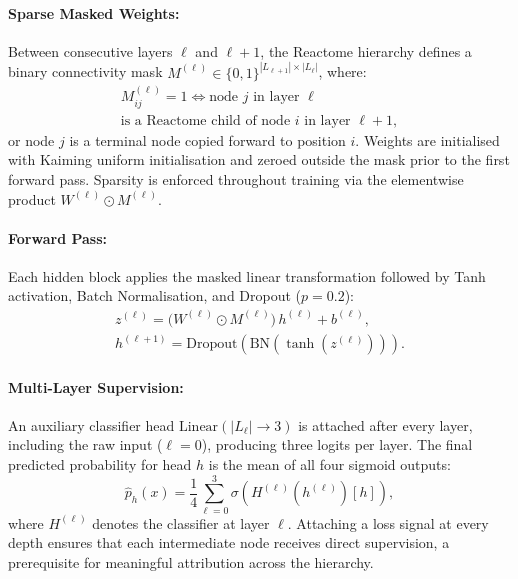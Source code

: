 \documentclass[sigconf]{acmart}
\begin{document}
\paragraph{Sparse Masked Weights:}
Between consecutive layers $\ell$ and $\ell+1$, the Reactome
hierarchy defines a binary connectivity mask
$M^{(\ell)} \in \{0,1\}^{|L_{\ell+1}| \times |L_\ell|}$, where:
\begin{equation}
\begin{gathered}
M^{(\ell)}_{ij} = 1 \iff \text{node } j \text{ in layer } \ell \\[4pt]
\text{is a Reactome child of node } i \text{ in layer } \ell{+}1,
\end{gathered}
\end{equation}
or node $j$ is a terminal node copied forward to position $i$.
Weights are initialised with Kaiming uniform initialisation and zeroed
outside the mask prior to the first forward pass. Sparsity is enforced
throughout training via the elementwise product
$W^{(\ell)} \odot M^{(\ell)}$.

\paragraph{Forward Pass:}
Each hidden block applies the masked linear transformation followed by
Tanh activation, Batch Normalisation, and Dropout ($p = 0.2$):
\begin{equation}
\begin{gathered}
z^{(\ell)} = \bigl(W^{(\ell)} \odot M^{(\ell)}\bigr)\, h^{(\ell)}
             + b^{(\ell)}, \\[4pt]
h^{(\ell+1)} = \text{Dropout}\!\left(
                 \text{BN}\!\left(\tanh\!\left(z^{(\ell)}\right)\right)
               \right).
\end{gathered}
\end{equation}

\paragraph{Multi-Layer Supervision:}
An auxiliary classifier head $\text{Linear}(|L_\ell| \to 3)$ is
attached after every layer, including the raw input ($\ell = 0$),
producing three logits per layer. The final predicted probability for
head $h$ is the mean of all four sigmoid outputs:
\begin{equation}
\hat{p}_h(x) = \frac{1}{4} \sum_{\ell=0}^{3}
               \sigma\!\left(H^{(\ell)}\!\left(h^{(\ell)}\right)[h]\right),
\end{equation}
where $H^{(\ell)}$ denotes the classifier at layer $\ell$. Attaching
a loss signal at every depth ensures that each intermediate node
receives direct supervision, a prerequisite for meaningful
attribution across the hierarchy.
\end{document}
